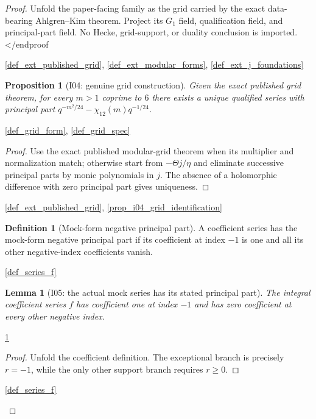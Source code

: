 \documentclass[11pt,a4paper]{article}
\numberwithin{equation}{section}
\theoremstyle{plain}\newtheorem{theorem}{Theorem}[section]\newaliascnt{proposition}{theorem}\newtheorem{proposition}[proposition]{Proposition}\aliascntresetthe{proposition}\newaliascnt{lemma}{theorem}\newtheorem{lemma}[lemma]{Lemma}\aliascntresetthe{lemma}
\theoremstyle{definition}\newaliascnt{definition}{theorem}\newtheorem{definition}[definition]{Definition}\aliascntresetthe{definition}\newaliascnt{notation}{theorem}\newtheorem{notation}[notation]{Notation}\aliascntresetthe{notation}
\providecommand{\lean}[1]{}\providecommand{\leanok}{}
\begin{document}
\begin{proof}Unfold the paper-facing family as the grid carried by the exact
data-bearing Ahlgren--Kim theorem.  Project its $G_1$ field, qualification
field, and principal-part field.  No Hecke, grid-support, or duality
conclusion is imported.</end{proof}
\begin{uses-proof}\ref{def_ext_published_grid}, \ref{def_ext_modular_forms}, \ref{def_ext_j_foundations}\end{uses-proof}

\begin{proposition}[I04: genuine grid construction]\label{prop_i04_grid_exists}\lean{SptCM.Analytic.Repaired.AhlgrenKimGridTheorem.existsUnique}\leanok
Given the exact published grid theorem, for every $m>1$ coprime to $6$ there
exists a unique qualified series with principal part
$q^{-m^2/24}-\chi_{12}(m)q^{-1/24}$.
\end{proposition}
\begin{uses-statement}\ref{def_grid_form}, \ref{def_grid_spec}\end{uses-statement}
\begin{proof}
Use the exact published modular-grid theorem when its multiplier and normalization match; otherwise start from $-\Theta j/\eta$ and eliminate successive principal parts by monic polynomials in $j$.  The absence of a holomorphic difference with zero principal part gives uniqueness.
\end{proof}
\begin{uses-proof}\ref{def_ext_published_grid}, \ref{prop_i04_grid_identification}\end{uses-proof}

\begin{definition}[Mock-form negative principal part]\label{def_i05_mock_principal_part}\lean{SptCM.Analytic.Repaired.HasMockPrincipalPart}\leanok
A coefficient series has the mock-form negative principal part if its
coefficient at index $-1$ is one and all its other negative-index
coefficients vanish.
\end{definition}
\begin{uses-statement}\ref{def_series_f}\end{uses-statement}

\begin{lemma}[I05: the actual mock series has its stated principal part]\label{lem_i05_actual_f_principal_part}\lean{SptCM.Analytic.Repaired.fSeries_hasMockPrincipalPart}\leanok
The integral coefficient series \(f\) has coefficient one at index \(-1\)
and has zero coefficient at every other negative index.
\end{lemma}
\begin{uses-statement}\ref{def_i05_mock_principal_part}\end{uses-statement}
\begin{proof}
Unfold the coefficient definition.  The exceptional branch is precisely
\(r=-1\), while the only other support branch requires \(r\ge0\).
\end{proof}
\begin{uses-proof}\ref{def_series_f}\end{uses-proof}


\end{proof}
\end{document}
